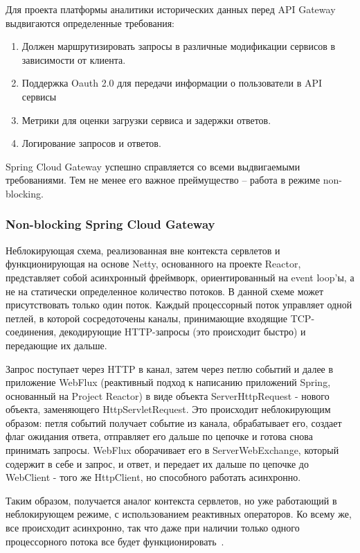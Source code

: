 Для проекта платформы аналитики исторических данных перед API Gateway выдвигаются определенные
требования:
\begin{enumerate}
    \item  Должен маршрутизировать запросы в различные модификации сервисов в зависимости от клиента.
    \item Поддержка Oauth 2.0 для передачи информации о пользователи в API сервисы
    \item Метрики для оценки загрузки сервиса и задержки ответов.
    \item Логирование запросов и ответов.
\end{enumerate}



Spring Cloud Gateway успешно справляется со всеми выдвигаемыми требованиями.
Тем не менее его важное преймущество -- работа в режиме non-blocking.

\subsubsection{Non-blocking Spring Cloud Gateway}

Неблокирующая схема, реализованная вне контекста сервлетов и функционирующая на основе Netty,
основанного на проекте Reactor, представляет собой асинхронный фреймворк, ориентированный на event
loop'ы, а не на статически определенное количество потоков.
В данной схеме может
присутствовать только один поток.
Каждый процессорный поток управляет одной петлей, в которой
сосредоточены каналы, принимающие входящие TCP-соединения, декодирующие HTTP-запросы (это происходит
быстро) и передающие их дальше.

Запрос поступает через HTTP в канал, затем через петлю событий и далее в приложение WebFlux (реактивный подход к написанию приложений Spring, основанный на Project Reactor) в виде объекта
ServerHttpRequest - нового объекта, заменяющего HttpServletRequest.
Это происходит неблокирующим
образом: петля событий получает событие из канала, обрабатывает его, создает флаг ожидания
ответа, отправляет его дальше по цепочке и готова снова принимать запросы.
WebFlux оборачивает его в
ServerWebExchange, который содержит в себе и запрос, и ответ, и передает их дальше по цепочке до
WebClient - того же HttpClient, но способного работать асинхронно.

Таким образом, получается аналог контекста сервлетов, но уже работающий в неблокирующем режиме, с
использованием реактивных операторов.
Ко всему же, все происходит асинхронно, так что даже при
наличии только одного процессорного потока все будет
функционировать~\cite{spirng_gateway}.

